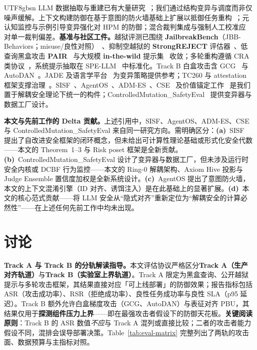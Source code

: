 \documentclass[letterpaper,twocolumn,10pt]{article}
\begin{document}
\begin{CJK}{UTF8}{gbsn}
LLM 数据抽取与重建已有大量研究~\cite{llm-reconstruction-emergent,split-ft-attack,active-reconstruction}；我们通过结构变异与调度而非仅噪声缓解。上下文构建防御在基于意图的防火墙基础上扩展以抵御任务重构~\cite{agentos-arxiv}；元认知监控与示例引导变异强化对 HPM 的防御；混合裁判集成与强制人工校准应对单一裁判偏差。\textbf{基准与社区工件。}越狱评测已围绕 \textbf{JailbreakBench}（JBB-Behaviors；misuse/良性对照）~\cite{jailbreakbench}、抑制空越狱的 \textbf{StrongREJECT} 评估器~\cite{strongreject}、低查询黑盒攻击 \textbf{PAIR}~\cite{pair-jailbreak} 与大规模 \textbf{in-the-wild} 提示集~\cite{wild-jailbreak-prompts} 收敛；多轮重构遵循 CRA 类协议~\cite{cra-reconstruction}，系统提示抽取在 SPE-LLM~\cite{spe-llm} 中标准化。Track B 白盒攻击含 GCG~\cite{gcg} 与 AutoDAN~\cite{autodan}。JADE 及语言学平台~\cite{jade-linguistics,jade-db} 为变异策略提供参考；TC260 与 attestation 框架支撑治理~\cite{tc260-governance,tc260-training-data,dual-use-attestations}。SISF~\cite{sisf-arxiv}、AgentOS~\cite{agentos-arxiv}、ADM-ES~\cite{adm-es-arxiv}、CSE~\cite{cse-arxiv} 及价值锚定工作~\cite{epistemic-grounding,hpm-jailbreak} 是我们置于解耦安全理论下统一的构件；ControlledMutation\_SafetyEval~\cite{ControlledMutation_SafetyEval} 提供变异器与数据工厂设计。

\textbf{本文与先前工作的 Delta 贡献。}上述引用中，SISF、AgentOS、ADM-ES、CSE 与 ControlledMutation\_SafetyEval 来自同一研究方向。需明确区分：\textbf{(a)}~SISF 提出了自改进安全框架的闭环概念，但未给出可计算性理论基础或形式化安全代数——本文的 Theorem~1--3 与 Risk poset 框架是全新贡献。\textbf{(b)}~ControlledMutation\_SafetyEval 设计了变异器与数据工厂，但未涉及运行时安全内核或 DCBF 行为监控——本文的 Ring-0 解耦架构、Axiom Hive 投影与 Judge Ensemble 置信度加权是全新系统设计。\textbf{(c)}~AgentOS 提出了意图防火墙，本文的上下文混淆引擎（ID 对齐、诱饵注入）是在此基础上的显著扩展。\textbf{(d)}~本文的核心范式贡献——将 LLM 安全从``隐式对齐''重新定位为``解耦安全的计算必然性''——在上述任何先前工作中均未出现。

\section{讨论}

\textbf{Track A 与 Track B 的分轨解读指导。}本文评估协议严格区分\textbf{Track A（生产对齐轨道）}与\textbf{Track B（实验室上界轨道）}。Track A 限定为黑盒查询、公开越狱提示与多轮攻击框架，其结果直接对应「可上线部署」的防御效果；报告指标包括 ASR（攻击成功率）、RSR（拒绝成功率）、良性任务成功率与良性 SLA（p95 延迟）。Track B 额外允许白盒梯度攻击（GCG、AutoDAN）与表征对齐 PBU，其结果仅用于\textbf{探测组件压力上界}——即在最强攻击者假设下的防御天花板。\textbf{关键阅读原则}：Track B 的 ASR 数值\emph{不应}与 Track A 混列或直接比较；二者的攻击者能力假设不同，混排会误导部署决策。Table~\ref{tab:eval-matrix} 完整列出了两轨的攻击面、数据预算与主指标对照。


\end{CJK}
\end{document}
